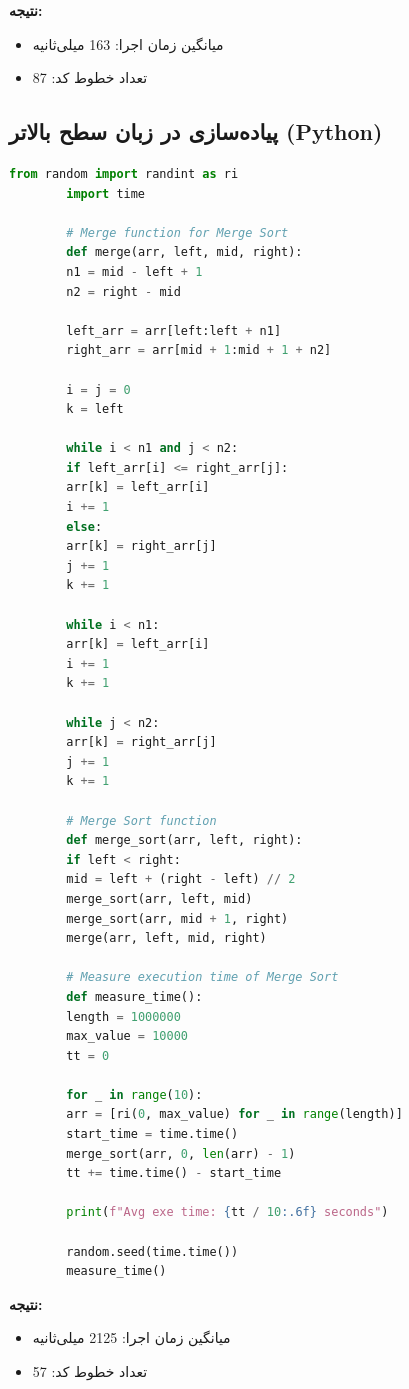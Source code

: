 \documentclass[12pt, a4paper]{report}
\begin{document}
\textbf{نتیجه:}
\begin{itemize}
	\item میانگین زمان اجرا: \textnormal{163} میلی‌ثانیه
	\item تعداد خطوط کد: \textnormal{87}
\end{itemize}


\subsection{پیاده‌سازی در زبان سطح بالاتر (Python)}
\begin{LTR}
	\begin{lstlisting}[language=Python, breaklines=true]
		from random import randint as ri
		import time
		
		# Merge function for Merge Sort
		def merge(arr, left, mid, right):
		n1 = mid - left + 1
		n2 = right - mid
		
		left_arr = arr[left:left + n1]
		right_arr = arr[mid + 1:mid + 1 + n2]
		
		i = j = 0
		k = left
		
		while i < n1 and j < n2:
		if left_arr[i] <= right_arr[j]:
		arr[k] = left_arr[i]
		i += 1
		else:
		arr[k] = right_arr[j]
		j += 1
		k += 1
		
		while i < n1:
		arr[k] = left_arr[i]
		i += 1
		k += 1
		
		while j < n2:
		arr[k] = right_arr[j]
		j += 1
		k += 1
		
		# Merge Sort function
		def merge_sort(arr, left, right):
		if left < right:
		mid = left + (right - left) // 2
		merge_sort(arr, left, mid)
		merge_sort(arr, mid + 1, right)
		merge(arr, left, mid, right)
		
		# Measure execution time of Merge Sort
		def measure_time():
		length = 1000000
		max_value = 10000
		tt = 0
		
		for _ in range(10):
		arr = [ri(0, max_value) for _ in range(length)]
		start_time = time.time()
		merge_sort(arr, 0, len(arr) - 1)
		tt += time.time() - start_time
		
		print(f"Avg exe time: {tt / 10:.6f} seconds")
		
		random.seed(time.time())
		measure_time()
	\end{lstlisting}
\end{LTR}

\textbf{نتیجه:}
\begin{itemize}
	\item میانگین زمان اجرا: \textnormal{2125} میلی‌ثانیه
	\item تعداد خطوط کد: \textnormal{57}
\end{itemize}
\end{document}
